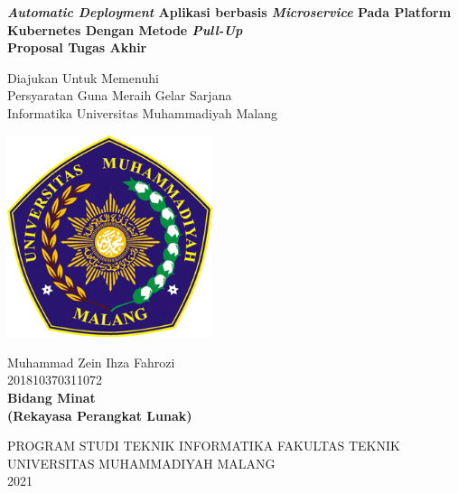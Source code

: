 \begin{titlepage}
	\begin{center}
		\onehalfspacing
		\large \bfseries \textit{Automatic Deployment}  Aplikasi berbasis \textit{Microservice} Pada Platform Kubernetes Dengan Metode \textit{Pull-Up} \\
		\vspace{1cm}
		\large Proposal Tugas Akhir \\
		\vspace{0.5cm}

		{\small \normalfont Diajukan Untuk Memenuhi\\
			Persyaratan Guna Meraih Gelar Sarjana\\
			Informatika Universitas Muhammadiyah Malang}
		\vspace{2cm}

		\includegraphics[width=6cm]{figures/logo_umm.png}

		\vspace{1cm}
		\normalfont \normalsize Muhammad Zein Ihza Fahrozi \\
		\normalfont \normalsize 201810370311072 \\

		\vspace{1cm}
		\bfseries \normalsize Bidang Minat \\
		\normalfont \normalsize (Rekayasa Perangkat Lunak)

		\vspace{2.5cm}

		\normalsize PROGRAM STUDI TEKNIK INFORMATIKA FAKULTAS TEKNIK \\
		UNIVERSITAS MUHAMMADIYAH MALANG \\
		2021



	\end{center}

\end{titlepage}

\newpage